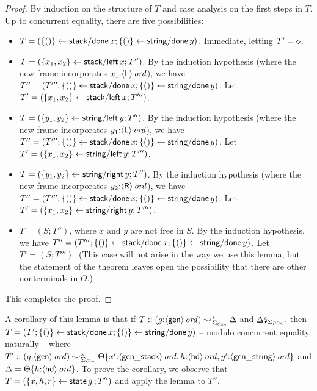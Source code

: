 \begin{proof}
By induction on the structure of $T$ and case analysis on the first
steps in $T$. Up to concurrent equality, there are five possibilities:
\begin{itemize}
\item $T = (\{{()}\} \leftarrow {{\sf stack/done}\,x}; \{{()}\} \leftarrow {{\sf
      string/done}\,y})$. Immediate, letting $T' = \diamond$.
\item $T = (\{{x_1,x_2}\} \leftarrow {{\sf stack/left}\,x}; T'')$. By the
  induction hypothesis (where the new frame incorporates
  $x_1{:}{\langle {\sf L} \rangle}\,{{\it ord}}$), we have $T'' = (T''';
  \{{()}\} \leftarrow {{\sf stack/done}\,x}; \{{()}\} \leftarrow {{\sf
      string/done}\,y})$. Let $T' = (\{{x_1,x_2}\} \leftarrow {{\sf
      stack/left}\,x}; T''')$.
\item $T = (\{{y_1,y_2}\} \leftarrow {{\sf string/left}\,y}; T'')$. By the
  induction hypothesis (where the new frame incorporates
  $y_1{:}{\langle {\sf L} \rangle}\,{{\it ord}}$), we have $T'' = (T''';
  \{{()}\} \leftarrow {{\sf stack/done}\,x}; \{{()}\} \leftarrow {{\sf
      string/done}\,y})$. Let $T' = (\{{x_1,x_2}\} \leftarrow {{\sf
      string/left}\,y}; T''')$.
\item $T = (\{{y_1,y_2}\} \leftarrow {{\sf string/right}\,y}; T'')$. By the
  induction hypothesis (where the new frame incorporates
  $y_2{:}{\langle {\sf R} \rangle}\,{{\it ord}}$), we have $T'' = (T''';
  \{{()}\} \leftarrow {{\sf stack/done}\,x}; \{{()}\} \leftarrow {{\sf
      string/done}\,y})$. Let $T' = (\{{x_1,x_2}\} \leftarrow {{\sf
      string/right}\,y}; T''')$.
\item $T = (S; T'')$, where $x$ and $y$ are not free in $S$. 
      By the induction hypothesis, we have
      $T'' = (T''';
       \{{()}\} \leftarrow {{\sf stack/done}\,x}; \{{()}\} \leftarrow {{\sf
       string/done}\,y})$. Let $T' = (S; T''')$. (This case will not arise
      in the way we use this lemma, but the statement of the theorem 
      leaves open the possibility that there are other nonterminals
      in $\Theta$.)
\end{itemize}
This completes the proof. 
\end{proof}

A corollary of this lemma is that if 
$T :: (g{:}{\langle {\sf gen} \rangle}\,{{\it ord}}) \leadsto^*_{\Sigma_{\it Gen}} \Delta$ and
  ${\Delta}{\mbox{\lightning}}_{\Sigma_{\it PDA}}$, then $T = (T';
  \{{()}\} \leftarrow {{\sf stack/done}\,x}; \{{()}\} \leftarrow {{\sf
      string/done}\,y})$ -- modulo concurrent equality, naturally -- 
where $T' ::
  (g{:}{\langle {\sf gen} \rangle}\,{{\it ord}}) \leadsto^*_{\Sigma_{\it Gen}}
  {\Theta}\{{x'{:}{\langle {\sf gen\_stack} \rangle}\,{{\it ord}},
    h{:}{\langle {\sf hd} \rangle}\,{{\it ord}}, y'{:}{\langle {\sf gen\_string} \rangle}\,{{\it ord}}}\}$
  and $\Delta = {\Theta}\{{h{:}{\langle {\sf hd} \rangle}\,{{\it ord}}}\}$. To prove
the corollary, we observe
that $T = (\{{x,h,r}\} \leftarrow {{\sf state}\,g\,}; T'')$ and apply the lemma
to $T''$. 


